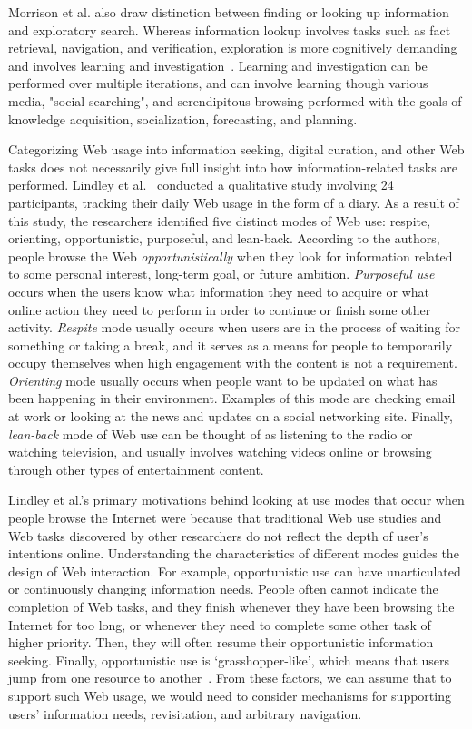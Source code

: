{{{Morrison et al. also draw distinction between finding or looking up information and exploratory search. Whereas information lookup involves tasks such as fact retrieval, navigation, and verification, exploration is more cognitively demanding and involves learning and investigation~\cite{marchionini2006exploratory}. Learning and investigation can be performed over multiple iterations, and can involve learning though various media, "social searching", and serendipitous browsing performed with the goals of knowledge acquisition, socialization, forecasting, and planning.  
\pagebreak

Categorizing Web usage into information seeking, digital curation, and other Web tasks does not necessarily give full insight into how information-related tasks are performed. Lindley et al.~\cite{lindley2012s} conducted a qualitative study involving 24 participants, tracking their daily Web usage in the form of a diary. As a result of this study, the researchers identified five distinct modes of Web use: respite, orienting, opportunistic, purposeful, and lean-back. According to the authors, people browse the Web \textit{opportunistically} when they look for information related to some personal interest, long-term goal, or future ambition. \textit{Purposeful use} occurs when the users know what information they need to acquire or what online action they need to perform in order to continue or finish some other activity. \textit{Respite} mode usually occurs when users are in the process of waiting for something or taking a break, and it serves as a means for people to temporarily occupy themselves when high engagement with the content is not a requirement. \textit{Orienting} mode usually occurs when people want to be updated on what has been happening in their environment. Examples of this mode are checking email at work or looking at the news and updates on a social networking site. Finally, \textit{lean-back} mode of Web use can be thought of as listening to the radio or watching television, and usually involves watching videos online or browsing through other types of entertainment content. 

Lindley et al.'s primary motivations behind looking at use modes that occur when people browse the Internet were because that traditional Web use studies and Web tasks discovered by other researchers do not reflect the depth of user's intentions online. Understanding the characteristics of different modes guides the design of Web interaction. For example, opportunistic use can have unarticulated or continuously changing information needs. People often cannot indicate the completion of Web tasks, and they finish whenever they have been browsing the Internet for too long, or whenever they need to complete some other task of higher priority. Then, they will often resume their opportunistic information seeking. Finally, opportunistic use is `grasshopper-like', which means that users jump from one resource to another~\cite{lindley2012s}. From these factors, we can assume that to support such Web usage, we would need to consider mechanisms for supporting users' information needs, revisitation, and arbitrary navigation.

}}}
